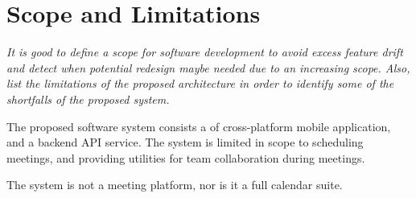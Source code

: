 \documentclass{article}
\begin{document}
\section{Scope and Limitations}

\textit{It is good to define a scope for software development to avoid excess
feature drift and detect when potential redesign maybe needed due to an
increasing scope. Also, list the limitations of the proposed architecture in
order to identify some of the shortfalls of the proposed system.}

The proposed software system consists a of cross-platform mobile application, 
and a backend API service. The system is limited in scope to scheduling
meetings, and providing utilities for team collaboration during meetings.

The system is not a meeting platform, nor is it a full calendar suite.
\end{document}
